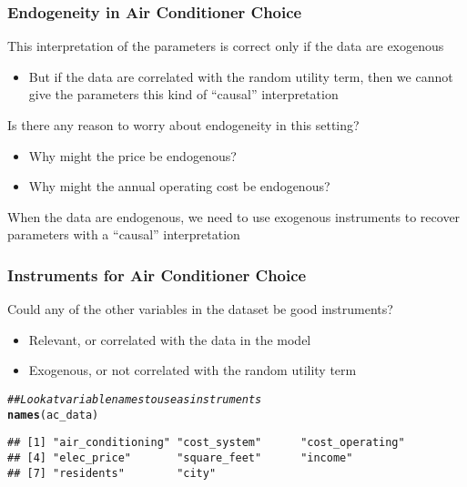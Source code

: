 \documentclass{beamer}\usepackage[]{graphicx}\usepackage[]{xcolor}
\makeatletter
\newcommand{\hlcom}[1]{\textcolor[rgb]{0.678,0.584,0.686}{\textit{#1}}}%
\newcommand{\hlstd}[1]{\textcolor[rgb]{0.345,0.345,0.345}{#1}}%
\newcommand{\hlkwd}[1]{\textcolor[rgb]{0.737,0.353,0.396}{\textbf{#1}}}%
\newenvironment{kframe}{%
 \def\at@end@of@kframe{}%
 \ifinner\ifhmode%
  \def\at@end@of@kframe{\end{minipage}}%
  \begin{minipage}{\columnwidth}%
 \fi\fi%
 \def\FrameCommand##1{\hskip\@totalleftmargin \hskip-\fboxsep
 \colorbox{shadecolor}{##1}\hskip-\fboxsep
     \hskip-\linewidth \hskip-\@totalleftmargin \hskip\columnwidth}%
 \MakeFramed {\advance\hsize-\width
   \@totalleftmargin\z@ \linewidth\hsize
   \@setminipage}}%
 {\par\unskip\endMakeFramed%
 \at@end@of@kframe}
\newenvironment{knitrout}{}{} %
\makeatother
\begin{document}
\begin{frame}\frametitle{Endogeneity in Air Conditioner Choice}
    This interpretation of the parameters is correct only if the data are exogenous
    \begin{itemize}
    	\item But if the data are correlated with the random utility term, then we cannot give the parameters this kind of ``causal'' interpretation
    \end{itemize}
    \vspace{3ex}
    Is there any reason to worry about endogeneity in this setting?
    \begin{itemize}
    	\item Why might the price be endogenous?
    	\item Why might the annual operating cost be endogenous?
    \end{itemize}
    \vspace{3ex}
    When the data are endogenous, we need to use exogenous instruments to recover parameters with a ``causal'' interpretation
\end{frame}

\begin{frame}[fragile]\frametitle{Instruments for Air Conditioner Choice}
    Could any of the other variables in the dataset be good instruments?
    \begin{itemize}
    	\item Relevant, or correlated with the data in the model
    	\item Exogenous, or not correlated with the random utility term
    \end{itemize}
\begin{knitrout}\footnotesize
{}\color{fgcolor}\begin{kframe}
\begin{alltt}
\hlcom{## Look at variable names to use as instruments}
\hlkwd{names}\hlstd{(ac_data)}
\end{alltt}
\begin{verbatim}
## [1] "air_conditioning" "cost_system"      "cost_operating"  
## [4] "elec_price"       "square_feet"      "income"          
## [7] "residents"        "city"
\end{verbatim}
\end{kframe}
\end{knitrout}
\end{frame}
\end{document}
